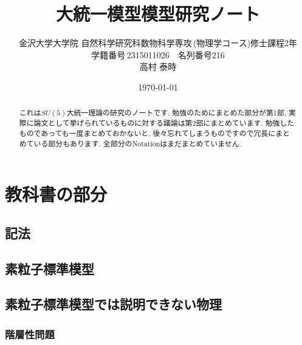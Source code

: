 \documentclass[uplatex,dvipdfmx,a4paper,titlepage]{jsbook}
\theoremstyle{plain}
\theoremstyle{definition}
\begin{document}
\title{大統一模型模型研究ノート}
\author{金沢大学大学院\,\,自然科学研究科数物科学専攻\,(物理学コース)修士課程2年\\学籍番号\,2315011026$\quad$名列番号216\\高村 泰時} 
\date{\today}
\maketitle


\tableofcontents
\clearpage


\begin{abstract}
  これは$SU(5)$大統一理論の研究のノートです.
  勉強のためにまとめた部分が第1部, 実際に論文として挙げられているものに対する議論は第2部にまとめています.
  勉強したものであっても一度まとめておかないと, 後々忘れてしまうものですので冗長にまとめている部分もあります.
  全部分のNotationはまだまとめていません.
\end{abstract}


\part{教科書の部分}

\chapter{記法}


\chapter{素粒子標準模型}


\chapter{素粒子標準模型では説明できない物理}


\section{階層性問題}

\end{document}
